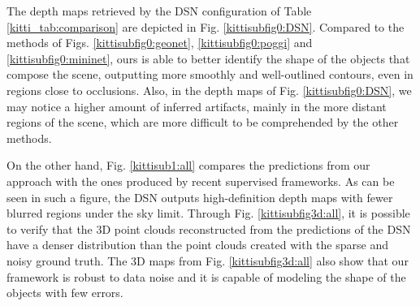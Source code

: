 \documentclass[5p]{elsarticle}
\begin{document}
The depth maps retrieved by the DSN configuration of Table \ref{kitti_tab:comparison} are depicted in Fig. \ref{kittisubfig0:DSN}. Compared to the methods of Figs. \ref{kittisubfig0:geonet}, \ref{kittisubfig0:poggi} and \ref{kittisubfig0:mininet}, ours is able to better identify the shape of the objects that compose the scene, outputting more smoothly and well-outlined contours, even in regions close to occlusions. Also, in the depth maps of Fig. \ref{kittisubfig0:DSN}, we may notice a higher amount of inferred artifacts, mainly in the more distant regions of the scene, which are more difficult to be comprehended by the other methods.

On the other hand, Fig. \ref{kittisub1:all} compares the predictions from our approach with the ones produced by recent supervised frameworks. As can be seen in such a figure, the DSN outputs high-definition depth maps with fewer blurred regions under the sky limit. Through Fig. \ref{kittisubfig3d:all}, it is possible to verify that the 3D point clouds reconstructed from the predictions of the DSN have a denser distribution than the point clouds created with the sparse and noisy ground truth. The 3D maps from Fig. \ref{kittisubfig3d:all} also show that our framework is robust to data noise and it is capable of modeling the shape of the objects with few errors.
\end{document}
